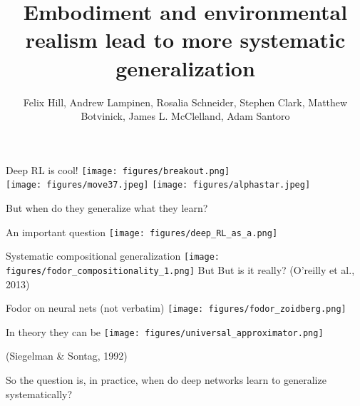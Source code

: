 \documentclass{beamer}
\begin{document}
\title{Embodiment and environmental realism lead to more systematic generalization}
\author{Felix Hill, Andrew Lampinen, Rosalia Schneider, Stephen Clark, Matthew Botvinick, James L. McClelland, Adam Santoro}
\date{}
\frame{\titlepage}

\begin{frame}{Deep RL is cool!}
\vspace{0.5em}
\centering
\texttt{[image: figures/breakout.png]}\\[-2pt]
\texttt{[image: figures/move37.jpeg]}%
\texttt{[image: figures/alphastar.jpeg]}
\end{frame}

\begin{frame}[standout]
But when do they generalize what they learn? 
\end{frame}

\begin{frame}{An important question}
\centering
\texttt{[image: figures/deep\_RL\_as\_a.png]}
\end{frame}

\begin{frame}{Systematic compositional generalization}
\vspace{-2em}
{
\centering
\texttt{[image: figures/fodor\_compositionality\_1.png]}
}
\vspace{-4em}
{\small But But is it really? (O'reilly et al., 2013)} %
\end{frame}

\begin{frame}{Fodor on neural nets (not verbatim)}
\centering
\texttt{[image: figures/fodor\_zoidberg.png]}
\end{frame}


\begin{frame}{In theory they can be}
\vspace{5em}
{
\centering
\texttt{[image: figures/universal\_approximator.png]}
}
\vspace{3em}

{\small (Siegelman \& Sontag, 1992)}
\end{frame}

\begin{frame}[standout]
So the question is, in practice, when do deep networks learn to generalize systematically? 
\end{frame}
\end{document}
